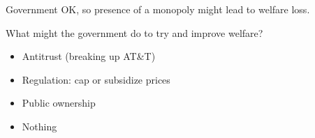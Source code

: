 \documentclass[aspectratio=169]{beamer}
\begin{document}
\begin{frame}{Government}
    OK, so presence of a monopoly might lead to welfare loss.

    \vspace{2mm}

    What might the government do to try and improve welfare?

    \vspace{5mm}

    \begin{itemize}
        \item Antitrust (breaking up AT\&T)
        \item Regulation: cap or subsidize prices
        \item Public ownership
        \item Nothing
    \end{itemize}
\end{frame}
\end{document}
